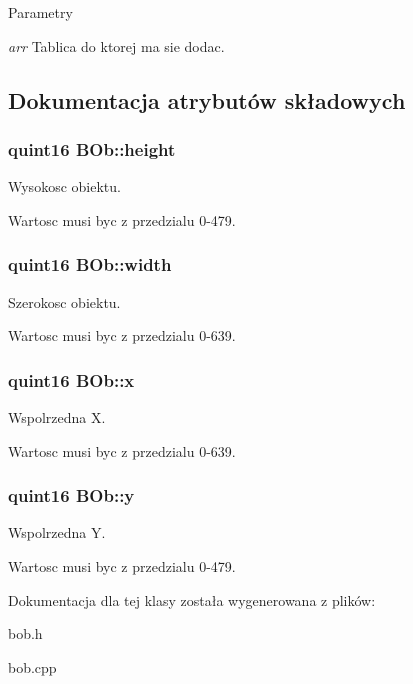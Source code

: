 \begin{DoxyParams}{Parametry}
\item[{\em arr}]Tablica do ktorej ma sie dodac. \end{DoxyParams}


\subsection{Dokumentacja atrybutów składowych}
\hypertarget{class_b_ob_ac406681bc6029dc6e41aa53791e9f210}{
\subsubsection[{height}]{\setlength{\rightskip}{0pt plus 5cm}quint16 {\bf BOb::height}}}
\label{class_b_ob_ac406681bc6029dc6e41aa53791e9f210}


Wysokosc obiektu. 

Wartosc musi byc z przedzialu 0-\/479. \hypertarget{class_b_ob_a3e1652784396111952cd16a77a666a2b}{
\subsubsection[{width}]{\setlength{\rightskip}{0pt plus 5cm}quint16 {\bf BOb::width}}}
\label{class_b_ob_a3e1652784396111952cd16a77a666a2b}


Szerokosc obiektu. 

Wartosc musi byc z przedzialu 0-\/639. \hypertarget{class_b_ob_a5dcc6a3c2f4ffaf3d630187e853dd876}{
\subsubsection[{x}]{\setlength{\rightskip}{0pt plus 5cm}quint16 {\bf BOb::x}}}
\label{class_b_ob_a5dcc6a3c2f4ffaf3d630187e853dd876}


Wspolrzedna X. 

Wartosc musi byc z przedzialu 0-\/639. \hypertarget{class_b_ob_ada96bf49e446d3f9a5ce02f36e44c9b4}{
\subsubsection[{y}]{\setlength{\rightskip}{0pt plus 5cm}quint16 {\bf BOb::y}}}
\label{class_b_ob_ada96bf49e446d3f9a5ce02f36e44c9b4}


Wspolrzedna Y. 

Wartosc musi byc z przedzialu 0-\/479. 

Dokumentacja dla tej klasy została wygenerowana z plików:\begin{DoxyCompactItemize}
\item 
bob.h\item 
bob.cpp\end{DoxyCompactItemize}
